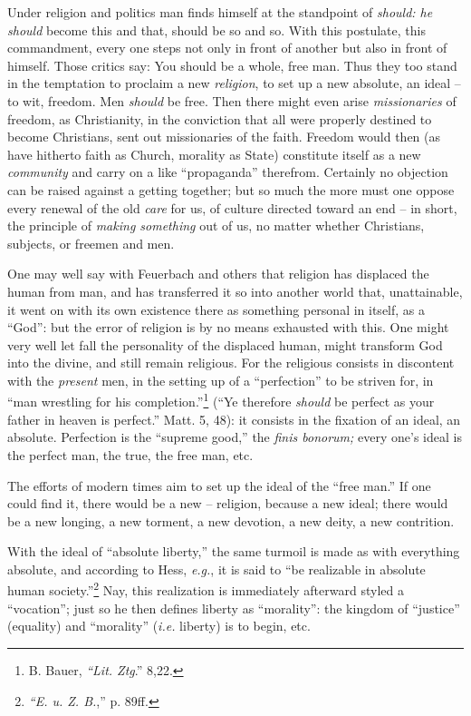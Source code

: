 \documentclass[12pt,a4paper]{book}
\begin{document}
Under religion and politics man finds himself at the standpoint of 
\textit{should: he should} become this and that, should be so and so. With 
this postulate, this commandment, every one steps not only in front of another 
but also in front of himself. Those critics say: You should be a whole, free 
man. Thus they too stand in the temptation to proclaim a new 
\textit{religion}, to set up a new absolute, an ideal -- to wit, freedom. Men 
\textit{should} be free. Then there might even arise \textit{missionaries} of 
freedom, as Christianity, in the conviction that all were properly destined to 
become Christians, sent out missionaries of the faith. Freedom would then (as 
have hitherto faith as Church, morality as State) constitute itself as a new 
\textit{community} and carry on a like ``propaganda'' therefrom. Certainly 
no objection can be raised against a getting together; but so much the more 
must one oppose every renewal of the old \textit{care} for us, of culture 
directed toward an end -- in short, the principle of \textit{making something} 
out of us, no matter whether Christians, subjects, or freemen and men.

One may well say with Feuerbach and others that religion has displaced the 
human from man, and has transferred it so into another world that, 
unattainable, it went on with its own existence there as something personal in 
itself, as a ``God'': but the error of religion is by no means exhausted 
with this. One might very well let fall the personality of the displaced 
human, might transform God into the divine, and still remain religious. For 
the religious consists in discontent with the \textit{present} men, in the 
setting up of a ``perfection'' to be striven for, in ``man wrestling for 
his completion.''\footnote{B. Bauer, \textit{``Lit. Ztg}.'' 8,22.} (``Ye 
therefore \textit{should} be perfect as your father in heaven is perfect.'' 
Matt. 5, 48): it consists in the fixation of an ideal, an absolute. Perfection 
is the ``supreme good,'' the \textit{finis bonorum;} every one's ideal is 
the perfect man, the true, the free man, etc.

The efforts of modern times aim to set up the ideal of the ``free man.'' If 
one could find it, there would be a new -- religion, because a new ideal; 
there would be a new longing, a new torment, a new devotion, a new deity, a 
new contrition.

With the ideal of ``absolute liberty,'' the same turmoil is made as with 
everything absolute, and according to Hess, \textit{e.g.}, it is said to 
``be realizable in absolute human society.''\footnote{\textit{``E. u. Z. 
B.},'' p. 89ff.} Nay, this realization is immediately afterward styled a 
``vocation''; just so he then defines liberty as ``morality'': the kingdom 
of ``justice'' (equality) and ``morality'' (\textit{i.e.} liberty) is to 
begin, etc.
\end{document}
